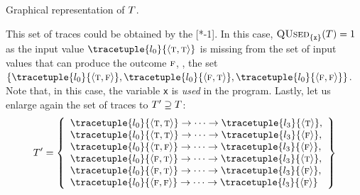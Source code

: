\begin{example}
\begin{marginfigure}[*-8]
\caption{Graphical representation of $T$.}
\end{marginfigure}
This set of traces could be obtained by the [*-1].
In this case, $\textup{\textsc{QUsed}}_{\{\texttt{x} \}}(T)=1$ as the input value $\tracetuple{\locinit}{\langle \true, \true\rangle}$ is missing from the set of input values that can produce the outcome $\textsc{f}$, \cf, the set $\{ \tracetuple{\locinit}{\langle \true, \false\rangle}, \tracetuple{\locinit}{\langle \false, \true\rangle}, \tracetuple{\locinit}{\langle \false, \false\rangle} \}$.
Note that, in this case, the variable \texttt{x} is \emph{used} in the program.
Lastly, let us enlarge again the set of traces to $T' \supseteq T$:
\begin{align*}
  \defsetoftraces'
  =
  \left\{
    \begin{array}{l}
      \tracetuple{\locinit}{\langle \true, \true\rangle}\tracearrow\tracetuple{\loc{3}}{\langle \true\rangle}, \\
      \tracetuple{\locinit}{\langle \true, \true\rangle}\tracearrow\tracetuple{\loc{3}}{\langle \false\rangle}, \\
      \tracetuple{\locinit}{\langle \true, \false\rangle}\tracearrow\tracetuple{\loc{3}}{\langle \false\rangle}, \\
      \tracetuple{\locinit}{\langle \false, \true\rangle}\tracearrow\tracetuple{\loc{3}}{\langle \true\rangle}, \\
      \tracetuple{\locinit}{\langle \false, \true\rangle}\tracearrow\tracetuple{\loc{3}}{\langle \false\rangle}, \\
      \tracetuple{\locinit}{\langle \false, \false\rangle}\tracearrow\tracetuple{\loc{3}}{\langle \false\rangle}
    \end{array}
    \right\}
\end{align*}
\begin{marginfigure}[*-6]
\end{marginfigure}
\end{example}
